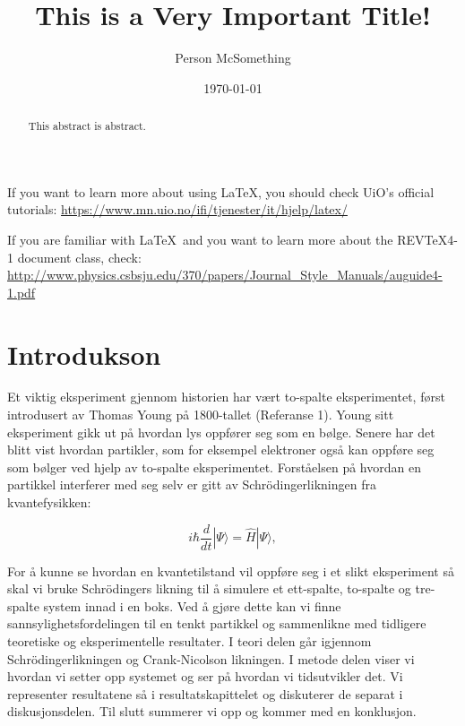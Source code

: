 \documentclass[reprint,english,notitlepage]{revtex4-2}  %
\begin{document}
\title{This is a Very Important Title!}   %
\author{Person McSomething}               %
\date{\today}                             %
\noaffiliation                            %
\begin{abstract}                          %
This abstract is abstract.                %
\end{abstract}                            %
\maketitle                                %

If you want to learn more about using \LaTeX, you should check UiO's official tutorials:
\url{https://www.mn.uio.no/ifi/tjenester/it/hjelp/latex/}

If you are familiar with \LaTeX\ and you want to learn more about the REVTeX4-1 document class, check:
\url{http://www.physics.csbsju.edu/370/papers/Journal_Style_Manuals/auguide4-1.pdf}


\section{Introdukson}

Et viktig eksperiment gjennom historien har vært to-spalte eksperimentet, først introdusert av Thomas Young på 1800-tallet (Referanse 1). Young sitt eksperiment gikk ut på hvordan lys oppfører seg som en bølge. Senere har det blitt vist hvordan partikler, som for eksempel elektroner også kan oppføre seg som bølger ved hjelp av to-spalte eksperimentet. Forståelsen på hvordan en partikkel interferer med seg selv er gitt av Schrödingerlikningen fra kvantefysikken:

\begin{equation}
i \hbar \frac{d}{dt} |\Psi\rangle = \hat{H} |\Psi\rangle,
\end{equation}

For å kunne se hvordan en kvantetilstand vil oppføre seg i et slikt eksperiment så skal vi bruke Schrödingers likning til å simulere et ett-spalte, to-spalte og tre-spalte system innad i en boks. Ved å gjøre dette kan vi finne sannsylighetsfordelingen til en tenkt partikkel og sammenlikne med tidligere teoretiske og eksperimentelle resultater. I teori delen går igjennom Schrödingerlikningen og Crank-Nicolson likningen. I metode delen viser vi hvordan vi setter opp systemet og ser på hvordan vi tidsutvikler det. Vi representer resultatene så i resultatskapittelet og diskuterer de separat i diskusjonsdelen. Til slutt summerer vi opp og kommer med en konklusjon.
\end{document}
